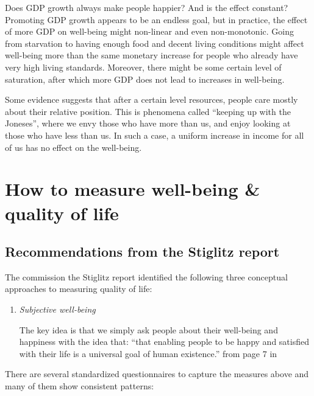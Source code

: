 \documentclass[]{book}
\begin{document}
\begin{enumerate}
  Does GDP growth always make people happier? And is the effect constant? Promoting GDP growth appears to be an endless goal, but in practice, the effect of more GDP on well-being might non-linear and even non-monotonic. Going from starvation to having enough food and decent living conditions might affect well-being more than the same monetary increase for people who already have very high living standards. Moreover, there might be some certain level of saturation, after which more GDP does not lead to increases in well-being.

  Some evidence suggests that after a certain level resources, people care mostly about their relative position. This is phenomena called ``keeping up with the Joneses'', where we envy those who have more than us, and enjoy looking at those who have less than us. In such a case, a uniform increase in income for all of us has no effect on the well-being.
\end{enumerate}

\hypertarget{how-to-measure-well-being-quality-of-life}{%
\section{How to measure well-being \& quality of life}\label{how-to-measure-well-being-quality-of-life}}

\hypertarget{recommendations-from-the-stiglitz-report}{%
\subsection{Recommendations from the Stiglitz report}\label{recommendations-from-the-stiglitz-report}}

The commission the Stiglitz report identified the following three conceptual approaches to measuring quality of life:

\begin{enumerate}
\def\labelenumi{\arabic{enumi}.}
\item
  \emph{Subjective well-being}

  The key idea is that we simply ask people about their well-being and happiness with the idea that: ``that enabling people to be happy and satisfied with their life is a universal goal of human existence.'' from page 7 in \citep{stiglitz2010report}
\end{enumerate}

There are several standardized questionnaires to capture the measures above and many of them show consistent patterns:
\end{document}

